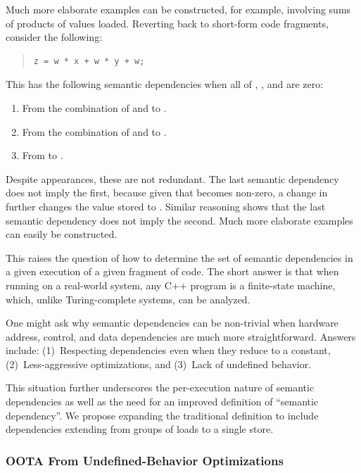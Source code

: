 \documentclass[10]{article}
\begin{document}
Much more elaborate examples can be constructed, for example,
involving sums of products of values loaded.
Reverting back to short-form code fragments, consider the following:

\begin{quote}
\begin{verbatim}
z = w * x + w * y + w;
\end{verbatim}
\end{quote}

This has the following semantic dependencies when all of ,
, and  are zero:

\begin{enumerate}
\item	From the combination of  and  to .
\item	From the combination of  and  to .
\item	From  to .
\end{enumerate}

Despite appearances, these are not redundant.
The last semantic dependency does not imply the first, because given
that  becomes non-zero, a change in  further changes
the value stored to .
Similar reasoning shows that the last semantic dependency does not
imply the second.
Much more elaborate examples can easily be constructed.

This raises the question of how to determine the set of semantic
dependencies in a given execution of a given fragment of code.
The short answer is that when running on a real-world system, 
any C++ program is a finite-state machine, which, unlike Turing-complete
systems, can be analyzed.

One might ask why semantic dependencies can be non-trivial when hardware
address, control, and data dependencies are much more straightforward.
Answers include:
(1)~Respecting dependencies even when they reduce to a constant,
(2)~Less-aggressive optimizations, and
(3)~Lack of undefined behavior.

This situation further underscores the per-execution nature of semantic
dependencies as well as the need for an improved definition of ``semantic
dependency''.
We propose expanding the traditional definition to include dependencies
extending from groups of loads to a single store.

\subsubsection{OOTA From Undefined-Behavior Optimizations}
\label{app:OOTA From Undefined-Behavior Optimizations}
\end{document}
